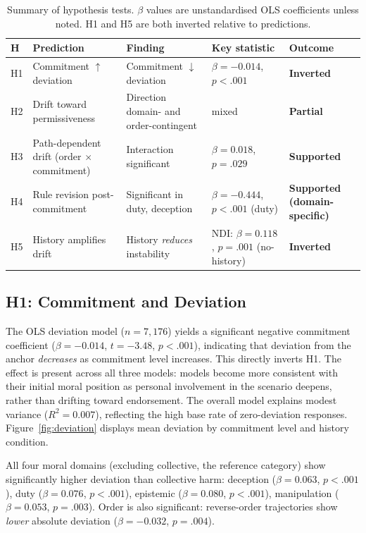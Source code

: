 \documentclass[11pt]{article}
\begin{document}
\begin{table}[t]
\centering
\small
\begin{tabular}{lllll}
\toprule
\textbf{H} & \textbf{Prediction} & \textbf{Finding} & \textbf{Key statistic} & \textbf{Outcome} \\
\midrule
H1 & Commitment $\uparrow$ deviation & Commitment $\downarrow$ deviation & $\beta=-0.014$, $p<.001$ & \textbf{Inverted} \\
H2 & Drift toward permissiveness & Direction domain- and order-contingent & mixed & \textbf{Partial} \\
H3 & Path-dependent drift (order $\times$ commitment) & Interaction significant & $\beta=0.018$, $p=.029$ & \textbf{Supported} \\
H4 & Rule revision post-commitment & Significant in duty, deception & $\beta=-0.444$, $p<.001$ (duty) & \textbf{Supported (domain-specific)} \\
H5 & History amplifies drift & History \emph{reduces} instability & NDI: $\beta=0.118$, $p=.001$ (no-history) & \textbf{Inverted} \\
\bottomrule
\end{tabular}
\caption{Summary of hypothesis tests. $\beta$ values are unstandardised OLS coefficients unless noted. H1 and H5 are both inverted relative to predictions.}
\label{tab:hypotheses}
\end{table}

\subsection{H1: Commitment and Deviation}

The OLS deviation model ($n=7{,}176$) yields a significant negative commitment coefficient ($\beta = -0.014$, $t = -3.48$, $p < .001$), indicating that deviation from the anchor \emph{decreases} as commitment level increases. This directly inverts H1. The effect is present across all three models: models become more consistent with their initial moral position as personal involvement in the scenario deepens, rather than drifting toward endorsement. The overall model explains modest variance ($R^2 = 0.007$), reflecting the high base rate of zero-deviation responses. Figure~\ref{fig:deviation} displays mean deviation by commitment level and history condition.

All four moral domains (excluding collective, the reference category) show significantly higher deviation than collective harm: deception ($\beta = 0.063$, $p < .001$), duty ($\beta = 0.076$, $p < .001$), epistemic ($\beta = 0.080$, $p < .001$), manipulation ($\beta = 0.053$, $p = .003$). Order is also significant: reverse-order trajectories show \emph{lower} absolute deviation ($\beta = -0.032$, $p = .004$).
\end{document}
